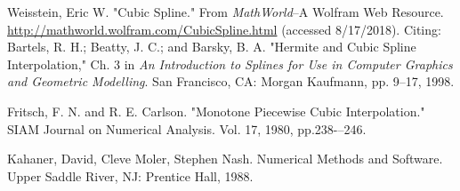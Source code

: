 \documentclass{scrartcl}
\begin{document}
\begin{thebibliography}{9}

Weisstein, Eric W. "Cubic Spline." From
\textit{MathWorld}--A Wolfram Web Resource.
\url{http://mathworld.wolfram.com/CubicSpline.html} (accessed
8/17/2018). Citing: Bartels, R. H.; Beatty, J. C.; and Barsky, B. A.
"Hermite and Cubic Spline Interpolation," Ch. 3 in
\textit{An Introduction to Splines for Use in Computer Graphics
and Geometric Modelling}. San Francisco, CA: Morgan Kaufmann,
pp. 9--17, 1998.

Fritsch, F. N. and R. E. Carlson. "Monotone Piecewise Cubic Interpolation." SIAM Journal on Numerical Analysis. Vol. 17, 1980, pp.238-–246.

Kahaner, David, Cleve Moler, Stephen Nash. Numerical Methods and Software. Upper Saddle River, NJ: Prentice Hall, 1988.

\end{thebibliography}
\end{document}
